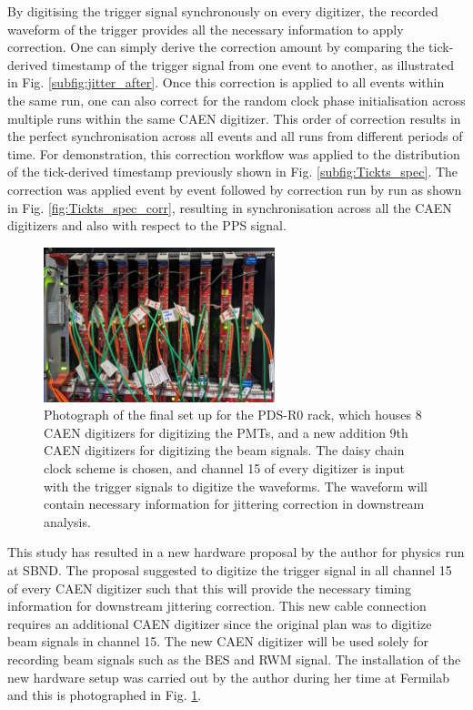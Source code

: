 By digitising the trigger signal synchronously on every digitizer, the recorded waveform of the trigger provides all the necessary information to apply correction.
One can simply derive the correction amount by comparing the tick-derived timestamp of the trigger signal from one event to another, as illustrated in Fig. \ref{subfig:jitter_after}.
Once this correction is applied to all events within the same run, one can also correct for the random clock phase initialisation across multiple runs within the same CAEN digitizer.
This order of correction results in the perfect synchronisation across all events and all runs from different periods of time.
For demonstration, this correction workflow was applied to the distribution of the tick-derived timestamp previously shown in Fig. \ref{subfig:Tickts_spec}.
The correction was applied event by event followed by correction run by run as shown in Fig. \ref{fig:Tickts_spec_corr}, resulting in synchronisation across all the CAEN digitizers and also with respect to the PPS signal.

\begin{figure}[htbp!] 
\centering    
\includegraphics[width=0.6\textwidth]{pds_r0}
\caption[pdsR0]{
Photograph of the final set up for the PDS-R0 rack, which houses 8 CAEN digitizers for digitizing the PMTs, and a new addition 9th CAEN digitizers for digitizing the beam signals.
The daisy chain clock scheme is chosen, and channel 15 of every digitizer is input with the trigger signals to digitize the waveforms.
The waveform will contain necessary information for jittering correction in downstream analysis.
}
\label{fig:pdsR0}
\end{figure}

This study has resulted in a new hardware proposal by the author for physics run at SBND.
The proposal suggested to digitize the trigger signal in all channel 15 of every CAEN digitizer such that this will provide the necessary timing information for downstream jittering correction.
This new cable connection requires an additional CAEN digitizer since the original plan was to digitize beam signals in channel 15.
The new CAEN digitizer will be used solely for recording beam signals such as the BES and RWM signal.
The installation of the new hardware setup was carried out by the author during her time at Fermilab and this is photographed in Fig. \ref{fig:pdsR0}.


